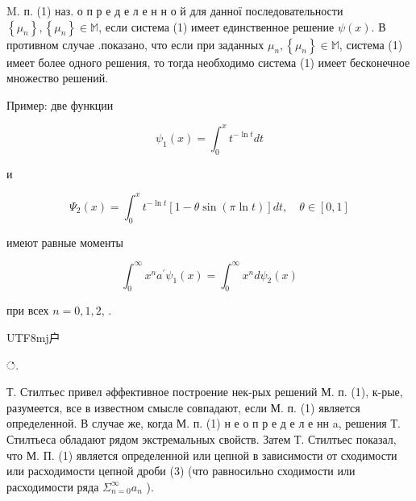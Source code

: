 \documentclass[10pt]{article}
\begin{document}
M. п. (1) наз. о п р е д е л е н н о й для данної последовательности $\left\{\mu_{n}\right\},\left\{\mu_{n}\right\} \in \mathbb{M}$, если система (1) имеет единственное решение $\psi(x)$. В противном случае .показано, что если при заданных $\mu_{n},\left\{\mu_{n}\right\} \in \mathbb{M}$, система (1) имеет более одного решения, то тогда необходимо система (1) имеет бесконечное множество решений.



Пример: две функции



\[

\psi_{1}(x)=\int_{0}^{x} t^{-\ln t} d t

\]



и



\[

\Psi_{2}(x)=\int_{0}^{x} t^{-\ln t}[1-\theta \sin (\pi \ln t)] d t, \quad \theta \in[0,1]

\]



имеют равные моменты



\[

\int_{0}^{\infty} x^{n} a^{\prime} \psi_{1}(x)=\int_{0}^{\infty} x^{n} d \psi_{2}(x)

\]



при всех $n=0,1,2$, . \begin{CJK}{UTF8}{mj}户\end{CJK}்.

Т. Стилтьес привел әффективное построение нек-рых решений М. п. (1), к-рые, разумеется, все в известном смысле совпадают, если М. п. (1) является определенной. В случае же, когда М. п. (1) н е о п р е д е л е нн a, решения Т. Стилтьеса обладают рядом экстремальных свойств. Затем Т. Стилтьес показал, что М. П. (1) является определенной или цепной в зависимости от сходимости или расходимости цепной дроби (3) (что равносильно сходимости или расходимости ряда $\Sigma_{n=0}^{\infty} a_{n}$ ).
\end{document}
